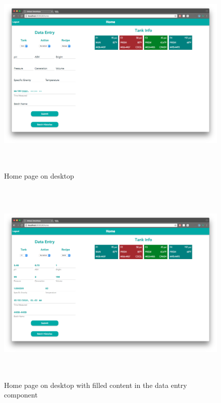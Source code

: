 \documentclass[draftclsnofoot,onecolumn,letterpaper,10pt,compsoc]{IEEEtran}
\begin{document}
\begin{figure}
  \centering
  \centerline{\includegraphics[height=10cm]{screenshots/desktop/home.png}}
  \caption{Home page on desktop}
\end{figure}
\begin{figure}
  \centering
  \centerline{\includegraphics[height=10cm]{screenshots/desktop/home_filled.png}}
  \caption{Home page on desktop with filled content in the data entry component}
\end{figure}
\end{document}
